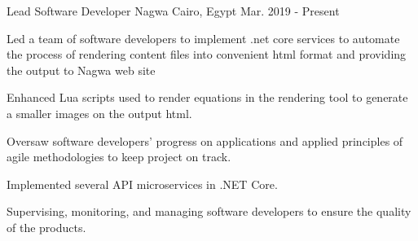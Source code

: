 

\begin{cventries}

  \cventry
    {Lead Software Developer} %
    {Nagwa} %
    {Cairo, Egypt} %
    {Mar. 2019 - Present} %
    {
      \begin{cvitems} %
        \item {Led a team of software developers to implement .net core services to automate the process of rendering content files into convenient html format and providing the output to Nagwa web site}
        \item {Enhanced Lua scripts used to render equations in the rendering tool to generate a smaller images on the output html.}
        \item {Oversaw software developers’ progress on applications and applied principles of agile methodologies to keep project on track.}
        \item {Implemented several API microservices in .NET Core.}
        \item {Supervising, monitoring, and managing software developers to ensure the quality of the products.}
      \end{cvitems}
    }


\end{cventries}
